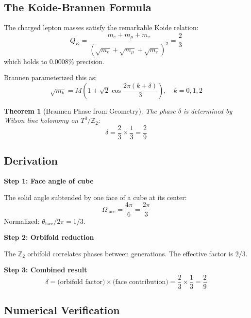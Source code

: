 \documentclass[12pt,a4paper]{article}
\newtheorem{theorem}{Theorem}[section]
\theoremstyle{definition}
\theoremstyle{remark}
\newcommand{\Tthree}{T^3}
\begin{document}
\subsection{The Koide-Brannen Formula}

The charged lepton masses satisfy the remarkable Koide relation:
\begin{equation}
Q_K = \frac{m_e + m_\mu + m_\tau}{(\sqrt{m_e} + \sqrt{m_\mu} + \sqrt{m_\tau})^2} = \frac{2}{3}
\end{equation}
which holds to 0.0008\% precision.

Brannen parameterized this as:
\begin{equation}
\sqrt{m_k} = M \left(1 + \sqrt{2} \cos\frac{2\pi(k + \delta)}{3}\right), \quad k = 0, 1, 2
\end{equation}

\begin{theorem}[Brannen Phase from Geometry]
The phase $\delta$ is determined by Wilson line holonomy on $\Tthree/\mathbb{Z}_2$:
\begin{equation}
\boxed{\delta = \frac{2}{3} \times \frac{1}{3} = \frac{2}{9}}
\end{equation}
\end{theorem}

\subsection{Derivation}

\textbf{Step 1: Face angle of cube}

The solid angle subtended by one face of a cube at its center:
\begin{equation}
\Omega_{\text{face}} = \frac{4\pi}{6} = \frac{2\pi}{3}
\end{equation}
Normalized: $\theta_{\text{face}} / 2\pi = 1/3$.

\textbf{Step 2: Orbifold reduction}

The $\mathbb{Z}_2$ orbifold correlates phases between generations. The effective factor is $2/3$.

\textbf{Step 3: Combined result}
\begin{equation}
\delta = \text{(orbifold factor)} \times \text{(face contribution)} = \frac{2}{3} \times \frac{1}{3} = \frac{2}{9}
\end{equation}

\subsection{Numerical Verification}
\end{document}
